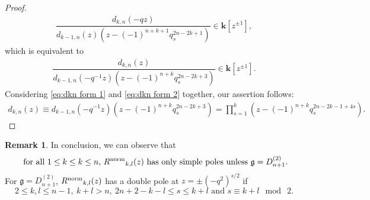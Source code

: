\documentclass[11pt, leqno]{amsart}
\theoremstyle{definition}
\newtheorem{remark}[theorem]{Remark}
\numberwithin{equation}{section}
\begin{document}
\begin{proof}
  \begin{align} \label{eq:dkn form 2}
    \dfrac{ d_{k,n}(-qz) }
  {d_{k-1,n}(z)(z-(-1)^{n+k+1}q_s^{2n-2k+1})} \in {\mathbf{k}}[z^{\pm 1}],
  \end{align}
which is equivalent to
\begin{align*}
    \dfrac{ d_{k,n}(z) }
  {d_{k-1,n}(-q^{-1}z)(z-(-1)^{n+k} q_s^{2n-2k+3})}\in {\mathbf{k}}[z^{\pm 1}].
  \end{align*}
Considering \eqref{eq:dkn form 1} and \eqref{eq:dkn form 2} together, our assertion follows:
\begin{align*}
  d_{k,n}(z)\equiv d_{k-1,n}(-q^{-1}z)(z-(-1)^{n+k}q_s^{2n-2k+3})
  =\prod_{s=1}^{k}(z-(-1)^{n+k}q_s^{2n-2k-1+4s}).
\end{align*}
\end{proof}

\begin{remark}
In conclusion, we can observe that
$$\text{ for all $1 \le k \le k \le n$, ${R^{\rm{norm}}}_{k,l}(z)$ has only simple poles unless ${\mathfrak g} = D^{(2)}_{n+1}$.}$$
For ${\mathfrak g}=D^{(2)}_{n+1}$, ${R^{\rm{norm}}}_{k,l}(z)$ has a double pole at $z=\pm(-q^2)^{s/2}$ if
$$ 2 \le k,l \le n-1, \ k+l > n, \ 2n+2-k-l \le s \le k+l \text{ and } s \equiv k+l \mod \ 2.$$
\end{remark}

\newpage
\appendix
\end{document}
